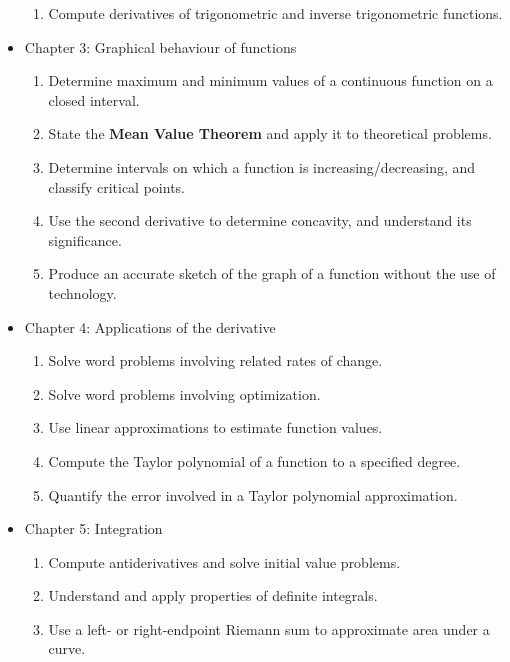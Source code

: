 \documentclass[10pt,]{article}
\newcommand{\terminology}[1]{\textbf{#1}}
\begin{document}
\begin{itemize}[label=]
\begin{enumerate}[label=\arabic*)]
\item\hypertarget{li-56}{}Compute derivatives of trigonometric and inverse trigonometric functions.%
\end{enumerate}
%
\pagebreak
\item{}\hypertarget{p-54}{}%
Chapter 3: Graphical behaviour of functions %
\begin{enumerate}[label=\arabic*)]
\item\hypertarget{li-58}{}Determine maximum and minimum values of a continuous function on a closed interval.%
\item\hypertarget{li-59}{}State the \terminology{Mean Value Theorem} and apply it to theoretical problems.%
\item\hypertarget{li-60}{}Determine intervals on which a function is increasing/decreasing, and classify critical points.%
\item\hypertarget{li-61}{}Use the second derivative to determine concavity, and understand its significance.%
\item\hypertarget{li-62}{}Produce an accurate sketch of the graph of a function without the use of technology.%
\end{enumerate}
%
\item{}\hypertarget{p-55}{}%
Chapter 4: Applications of the derivative %
\begin{enumerate}[label=\arabic*)]
\item\hypertarget{li-64}{}Solve word problems involving related rates of change.%
\item\hypertarget{li-65}{}Solve word problems involving optimization.%
\item\hypertarget{li-66}{}Use linear approximations to estimate function values.%
\item\hypertarget{li-67}{}Compute the Taylor polynomial of a function to a specified degree.%
\item\hypertarget{li-68}{}Quantify the error involved in a Taylor polynomial approximation.%
\end{enumerate}
%
\item{}\hypertarget{p-56}{}%
Chapter 5: Integration %
\begin{enumerate}[label=\arabic*)]
\item\hypertarget{li-70}{}Compute antiderivatives and solve initial value problems.%
\item\hypertarget{li-71}{}Understand and apply properties of definite integrals.%
\item\hypertarget{li-72}{}Use a left- or right-endpoint Riemann sum to approximate area under a curve.%

\end{enumerate}
\end{itemize}
\end{document}
